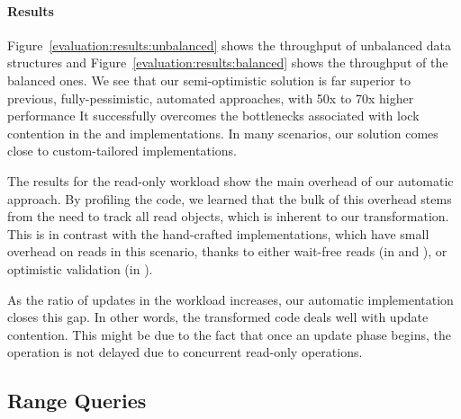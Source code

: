 \paragraph{Results}
Figure~\ref{evaluation:results:unbalanced} 
shows the throughput of unbalanced data structures and Figure~\ref{evaluation:results:balanced} shows
the throughput of the balanced ones. We see that our semi-optimistic
solution is far superior to previous, fully-pessimistic, 
automated approaches, with 50x to 70x 
higher performance
It successfully overcomes the bottlenecks associated with lock contention
in the \domTree and \domTreap implementations. In
many scenarios, our solution comes close to custom-tailored implementations. 

\begin{figure*}
\begin{center}

\end{center}
\caption{Throughput of unbalanced data structures.}
\label{evaluation:results:unbalanced}
\end{figure*}


\begin{figure*}
\begin{center}

\end{center}
\caption{Throughput of balanced data
structures.}
\label{evaluation:results:balanced}
\end{figure*}

The results for the read-only workload show the main overhead
of our automatic approach. By profiling the code, we learned 
that the bulk of this overhead stems from the need to track all read objects,
which is inherent to our transformation. 
This is in contrast with the hand-crafted implementations,
which have small overhead on reads in this scenario, thanks to either 
wait-free reads (in \danaTree and \danaAVL), or optimistic validation (in \bronson). 
 
As the ratio of updates in the workload increases, our automatic implementation 
closes this gap.
In other words, the transformed code deals well with update contention. 
This might be due to the fact that once
an update phase begins, the operation is not delayed due to concurrent 
read-only operations. 


\subsection{Range Queries}
\label{sec:range} 

